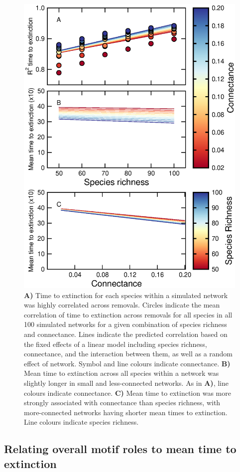 \documentclass[12pt]{article}
\begin{document}
		\begin{figure}[hb!]
			\caption{\textbf{A)} Time to extinction for each species within a simulated network was highly correlated across removals. Circles indicate the mean correlation of time to extinction across removals for all species in all 100 simulated networks for a given combination of species richness and connectance. Lines indicate the predicted correlation based on the fixed effects of a linear model including species richness, connectance, and the interaction between them, as well as a random effect of network. Symbol and line colours indicate connectance. \textbf{B)} Mean time to extinction across all species within a network was slightly longer in small and less-connected networks. As in \textbf{A)}, line colours indicate connectance. \textbf{C)} Mean time to extinction was more strongly associated with connectance than species richness, with more-connected networks having shorter mean times to extinction. Line colours indicate species richness.}
			\label{extorder_corrs}
			\includegraphics[width=.75\textwidth]{figures/extinction_order/extorder_correlations.eps}
			\end{figure}

    \subsection*{Relating overall motif roles to mean time to extinction}
    
\end{document}
